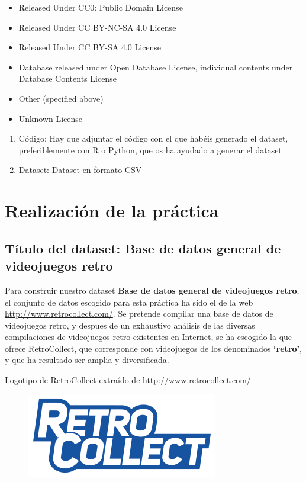 \documentclass[]{article}
\providecommand{\tightlist}{%
  \setlength{\itemsep}{0pt}\setlength{\parskip}{0pt}}
\begin{document}
\begin{itemize}
\tightlist
\item
  Released Under CC0: Public Domain License
\item
  Released Under CC BY-NC-SA 4.0 License
\item
  Released Under CC BY-SA 4.0 License
\item
  Database released under Open Database License, individual contents
  under Database Contents License
\item
  Other (specified above)
\item
  Unknown License
\end{itemize}

\begin{enumerate}
\def\labelenumi{\arabic{enumi}.}
\setcounter{enumi}{8}
\tightlist
\item
  Código: Hay que adjuntar el código con el que habéis generado el
  dataset, preferiblemente con R o Python, que os ha ayudado a generar
  el dataset
\item
  Dataset: Dataset en formato CSV
\end{enumerate}

\clearpage

\section{Realización de la práctica}\label{realizacion-de-la-practica}

\subsection{Título del dataset: Base de datos general de videojuegos
retro}\label{titulo-del-dataset-base-de-datos-general-de-videojuegos-retro}

Para construir nuestro dataset \textbf{Base de datos general de
videojuegos retro}, el conjunto de datos escogido para esta práctica ha
sido el de la web \url{http://www.retrocollect.com/}. Se pretende
compilar una base de datos de videojuegos retro, y despues de un
exhaustivo análisis de las diversas compilaciones de videojuegos retro
existentes en Internet, se ha escogido la que ofrece RetroCollect, que
corresponde con videojuegos de los denominados \textbf{`retro'}, y que
ha resultado ser amplia y diversificada.

Logotipo de RetroCollect extraído de \url{http://www.retrocollect.com/}

\begin{figure}[h!]
\centering
\includegraphics{RetroCollect-Logo.png}
\end{figure}
\end{document}
